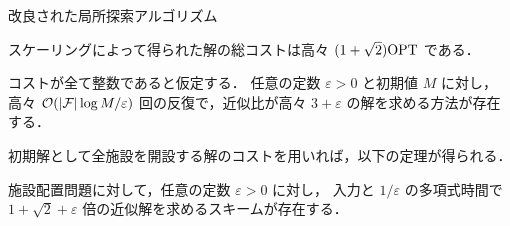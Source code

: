 \begin{frame}{改良された局所探索アルゴリズム}
	\begin{lemma}[開設コストのスケーリングによる近似比の改善]
		スケーリングによって得られた解の総コストは高々 \((1 + \sqrt{2})\text{\upshape OPT}\) である．
	\end{lemma}
	\begin{lemma}[閾値付きの近傍探索による反復回数と近似比]
		コストが全て整数であると仮定する．
		任意の定数 \(\varepsilon > 0\) と初期値 \(M\) に対し，高々 \(\mathcal{O}(|\mathcal{F}| \log{M} / \varepsilon)\) 回の反復で，近似比が高々 \(3 + \varepsilon\) の解を求める方法が存在する．
	\end{lemma}

	初期解として全施設を開設する解のコストを用いれば，以下の定理が得られる．

	\begin{theorem}
		施設配置問題に対して，任意の定数 \(\varepsilon > 0\) に対し，
		入力と \(1/\varepsilon\) の多項式時間で \alert{\(1 + \sqrt{2} + \varepsilon\)} 倍の近似解を求めるスキームが存在する．
	\end{theorem}

\end{frame}

